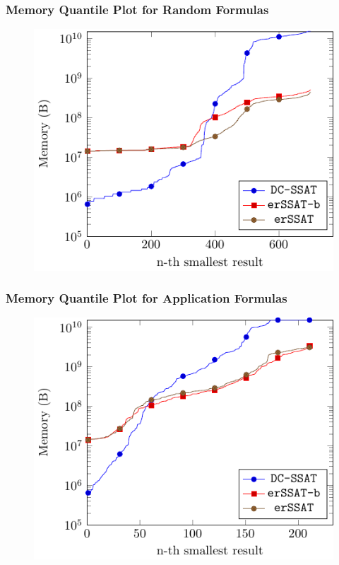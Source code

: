 \iffalse
    \begin{frame}
        \frametitle{Memory Quantile Plot for Random Formulas}
        \begin{figure}
            \centering
            \includegraphics{fig/exist-random-ssat/quantile-memory-Random.pdf}
        \end{figure}
    \end{frame}

    \begin{frame}
        \frametitle{Memory Quantile Plot for Application Formulas}
        \begin{figure}
            \centering
            \includegraphics{fig/exist-random-ssat/quantile-memory-Application.pdf}
        \end{figure}
    \end{frame}

